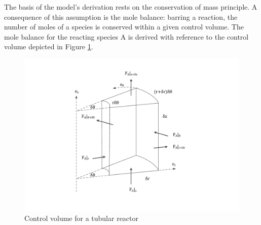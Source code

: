 \documentclass[11pt,fleqn]{article}
\theoremstyle{defstyle}
\begin{document}
The basis of the model's derivation rests on the conservation of mass principle. A consequence of this assumption is the mole balance: barring a reaction, the number of moles of a species is conserved within a given control volume. The mole balance for the reacting species A is derived with reference to the control volume depicted in Figure \ref{fig_vol_element}.

\begin{figure}[H] 
\centering
\includegraphics[scale=0.5]{volume_element}
\caption{Control volume for a tubular reactor} 
\label{fig_vol_element}
\end{figure}
\end{document}
